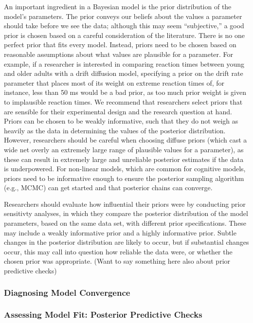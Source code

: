 \documentclass[
  english,
  ,man,floatsintext]{apa6}
\begin{document}
An important ingredient in a Bayesian model is the prior distribution of the model's parameters. The prior conveys our beliefs about the values a parameter should take before we see the data; although this may seem \enquote{subjective,} a good prior is chosen based on a careful consideration of the literature. There is no one perfect prior that fits every model. Instead, priors need to be chosen based on reasonable assumptions about what values are plausible for a parameter. For example, if a researcher is interested in comparing reaction times between young and older adults with a drift diffusion model, specifying a prior on the drift rate parameter that places most of its weight on extreme reaction times of, for instance, less than 50 ms would be a bad prior, as too much prior weight is given to implausible reaction times. We recommend that researchers select priors that are sensible for their experimental design and the research question at hand. Priors can be chosen to be weakly informative, such that they do not weigh as heavily as the data in determining the values of the posterior distribution. However, researchers should be careful when choosing diffuse priors (which cast a wide net overly an extremely large range of plausible values for a parameter), as these can result in extremely large and unreliable posterior estimates if the data is underpowered. For non-linear models, which are common for cognitive models, priors need to be informative enough to ensure the posterior sampling algorithm (e.g., MCMC) can get started and that posterior chains can converge.

Researchers should evaluate how influential their priors were by conducting prior sensitivty analyses, in which they compare the posterior distribution of the model parameters, based on the same data set, with different prior specifications. These may include a weakly informative prior and a highly informative prior. Subtle changes in the posterior distribution are likely to occur, but if substantial changes occur, this may call into question how reliable the data were, or whether the chosen prior was appropriate. (Want to say something here also about prior predictive checks)

\hypertarget{diagnosing-model-convergence}{%
\subsubsection{Diagnosing Model Convergence}\label{diagnosing-model-convergence}}

\hypertarget{assessing-model-fit-posterior-predictive-checks}{%
\subsubsection{Assessing Model Fit: Posterior Predictive Checks}\label{assessing-model-fit-posterior-predictive-checks}}
\end{document}
